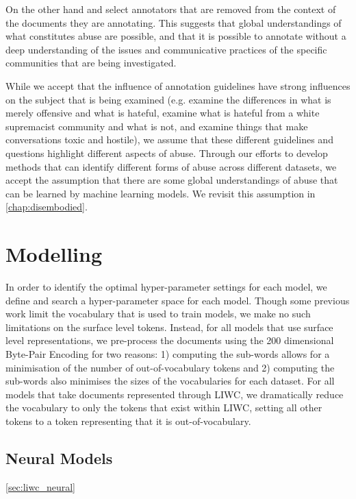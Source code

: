 On the other hand \citet{Garcia:2019} and \citet{Davidson:2017} select annotators that are removed from the context of the documents they are annotating. This suggests that global understandings of what constitutes abuse are possible, and that it is possible to annotate without a deep understanding of the issues and communicative practices of the specific communities that are being investigated.

While we accept that the influence of annotation guidelines have strong influences on the subject that is being examined (e.g. \citet{Davidson:2017} examine the differences in what is merely offensive and what is hateful, \citet{Garcia:2019} examine what is hateful from a white supremacist community and what is not, and \citet{Wulczyn:2017} examine things that make conversations toxic and hostile), we assume that these different guidelines and questions highlight different aspects of abuse. Through our efforts to develop methods that can identify different forms of abuse across different datasets, we accept the assumption that there are some global understandings of abuse that can be learned by machine learning models. We revisit this assumption in \autoref{chap:disembodied}.

\section{Modelling}

In order to identify the optimal hyper-parameter settings for each model, we define and search a hyper-parameter space for each model. Though some previous work \cite{Waseem:2018, CITE: Other papers that restrict vocabulary sizes} limit the vocabulary that is used to train models, we make no such limitations on the surface level tokens. Instead, for all models that use surface level representations, we pre-process the documents using the 200 dimensional Byte-Pair Encoding \cite{Heinzerling:2018} for two reasons: 1) computing the sub-words allows for a minimisation of the number of out-of-vocabulary tokens and 2) computing the sub-words also minimises the sizes of the vocabularies for each dataset. For all models that take documents represented through LIWC, we dramatically reduce the vocabulary to only the tokens that exist within LIWC, setting all other tokens to a token representing that it is out-of-vocabulary.

\subsection{Neural Models}\ref{sec:liwc_neural}

